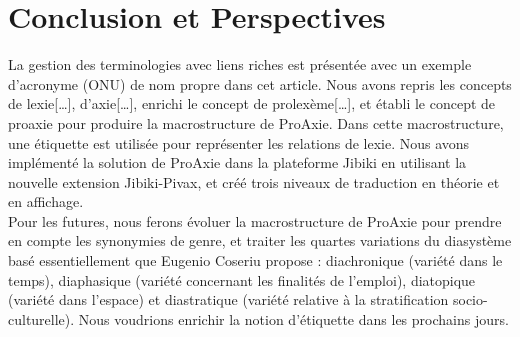 \documentclass[10pt,a4paper,twoside]{article}
\begin{document}
\section{Conclusion et Perspectives}
La gestion des terminologies avec liens riches est présentée avec un exemple d’acronyme (ONU) de nom propre dans cet article. Nous avons repris les concepts de lexie[…], d’axie[…], enrichi le concept de prolexème[…],  et établi le concept de proaxie pour produire la macrostructure de ProAxie. Dans cette macrostructure, une étiquette est utilisée pour représenter les relations de lexie. Nous avons implémenté la solution de ProAxie dans la plateforme Jibiki en utilisant la nouvelle extension Jibiki-Pivax, et créé trois niveaux de traduction en théorie et en affichage. \\
Pour les futures, nous ferons évoluer la macrostructure de ProAxie pour prendre en compte les synonymies de genre, et traiter les quartes variations du diasystème basé essentiellement que Eugenio Coseriu propose : diachronique (variété dans le temps), diaphasique (variété concernant les finalités de l'emploi), diatopique (variété dans l'espace) et diastratique (variété relative à la stratification socio-culturelle). Nous voudrions enrichir la notion d’étiquette dans les prochains jours.  \\





\end{document}
